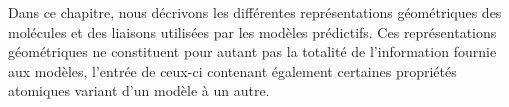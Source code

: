 \par Dans ce chapitre, nous décrivons les différentes représentations géométriques des molécules et des liaisons utilisées par les modèles prédictifs. Ces représentations géométriques ne constituent pour autant pas la totalité de l'information fournie aux modèles, l'entrée de ceux-ci contenant également certaines propriétés atomiques variant d'un modèle à un autre.